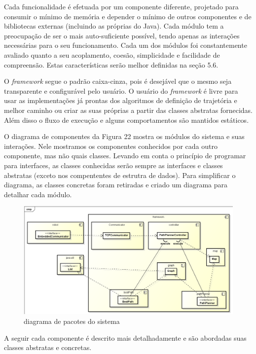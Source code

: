 Cada funcionalidade é efetuada por um componente diferente, projetado para consumir o mínimo de memória e depender o mínimo de outros componentes e de bibliotecas externas (incluindo as próprias do Java). Cada módulo tem a preocupação de ser o mais auto-suficiente possível, tendo apenas as interações necessárias para o seu funcionamento. Cada um dos módulos foi constantemente avaliado quanto a seu acoplamento, coesão,  simplicidade e facilidade de compreensão. Estas características serão melhor definidas na seção 5.6.

O \textit{framework} segue o padrão caixa-cinza, pois é desejável que o mesmo seja transparente e configurável pelo usuário. O usuário do \textit{framework} é livre para usar as implementações já prontas dos algoritmos de definição de trajetória e melhor caminho ou criar as suas próprias a partir das classes abstratas fornecidas. Além disso o fluxo de execução e alguns comportamentos são mantidos estáticos.

O diagrama de componentes da Figura 22 mostra os módulos do sistema e suas interações. Nele mostramos os componentes conhecidos por cada outro componente, mas não quais classes. Levando em conta o princípio de programar para interfaces, as classes conhecidas serão sempre as interfaces e classes abstratas (exceto nos compententes de estrutra de dados). Para simplificar o diagrama, as classes concretas foram retiradas e criado um diagrama para detalhar cada módulo.

\begin{figure}[h]
	\centering
	\label{fig22}
		\includegraphics[keepaspectratio=true,scale=0.4]{figuras/componentes.png}
	\caption{diagrama de pacotes do sistema}
\end{figure}

A seguir cada componente é descrito mais detalhadamente e são abordadas suas classes abstratas e concretas.

